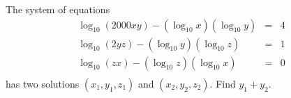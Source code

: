The system of equations
\begin{eqnarray*}\log_{10}(2000xy) - (\log_{10}x)(\log_{10}y) & = & 4 \\
\log_{10}(2yz) - (\log_{10}y)(\log_{10}z) & = & 1 \\
\log_{10}(zx) - (\log_{10}z)(\log_{10}x) & = & 0 \\
\end{eqnarray*}
has two solutions $ (x_{1},y_{1},z_{1})$ and $ (x_{2},y_{2},z_{2}).$ Find $ y_{1} + y_{2}.$